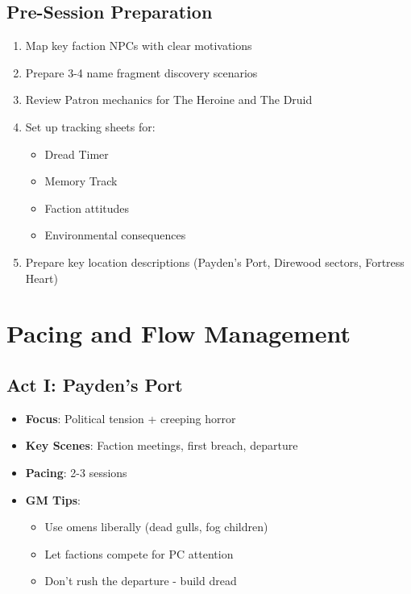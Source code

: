 \documentclass[11pt]{article}
\begin{document}
\subsection{Pre-Session Preparation}
\begin{enumerate}
    \item Map key faction NPCs with clear motivations
    \item Prepare 3-4 name fragment discovery scenarios
    \item Review Patron mechanics for The Heroine and The Druid
    \item Set up tracking sheets for:
        \begin{itemize}
            \item Dread Timer 
            \item Memory Track
            \item Faction attitudes
            \item Environmental consequences
        \end{itemize}
    \item Prepare key location descriptions (Payden's Port, Direwood sectors, Fortress Heart)
\end{enumerate}

\section{Pacing and Flow Management}

\subsection{Act I: Payden's Port}
\begin{itemize}
    \item \textbf{Focus}: Political tension + creeping horror
    \item \textbf{Key Scenes}: Faction meetings, first breach, departure
    \item \textbf{Pacing}: 2-3 sessions
    \item \textbf{GM Tips}: 
        \begin{itemize}
            \item Use omens liberally (dead gulls, fog children)
            \item Let factions compete for PC attention
            \item Don't rush the departure - build dread
        \end{itemize}
\end{itemize}
\end{document}
